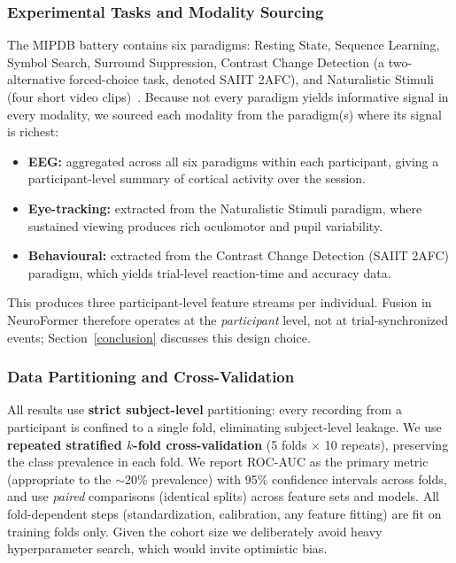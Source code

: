 \subsubsection{Experimental Tasks and Modality Sourcing}
\label{sec:tasks}
The MIPDB battery contains six paradigms: Resting State, Sequence Learning, Symbol
Search, Surround Suppression, Contrast Change Detection (a two-alternative
forced-choice task, denoted SAIIT 2AFC), and Naturalistic Stimuli (four short video
clips)~\cite{Langer2017}. Because not every paradigm yields informative signal in
every modality, we sourced each modality from the paradigm(s) where its signal is
richest:
\begin{itemize}
    \item \textbf{EEG:} aggregated across all six paradigms within each participant,
    giving a participant-level summary of cortical activity over the session.
    \item \textbf{Eye-tracking:} extracted from the Naturalistic Stimuli paradigm,
    where sustained viewing produces rich oculomotor and pupil variability.
    \item \textbf{Behavioural:} extracted from the Contrast Change Detection (SAIIT
    2AFC) paradigm, which yields trial-level reaction-time and accuracy data.
\end{itemize}
This produces three participant-level feature streams per individual. Fusion in
NeuroFormer therefore operates at the \emph{participant} level, not at
trial-synchronized events; Section~\ref{conclusion} discusses this design choice.

\subsubsection{Data Partitioning and Cross-Validation}
\label{sec:partition}
All results use \textbf{strict subject-level} partitioning: every recording from a
participant is confined to a single fold, eliminating subject-level leakage. We use
\textbf{repeated stratified $k$-fold cross-validation} (5 folds $\times$ 10 repeats),
preserving the class prevalence in each fold. We report ROC-AUC as the primary metric
(appropriate to the $\sim$20\% prevalence) with 95\% confidence intervals across
folds, and use \emph{paired} comparisons (identical splits) across feature sets and
models. All fold-dependent steps (standardization, calibration, any feature fitting)
are fit on training folds only. Given the cohort size we deliberately avoid heavy
hyperparameter search, which would invite optimistic bias.

